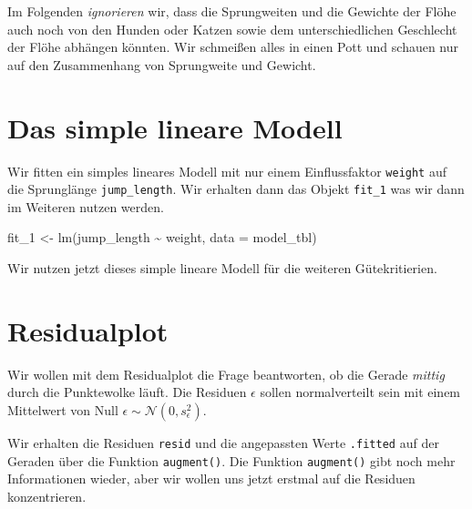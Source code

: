 \documentclass[
  letterpaper,
]{scrbook}
\newenvironment{Shaded}{\begin{snugshade}}{\end{snugshade}}
\newcommand{\AttributeTok}[1]{\textcolor[rgb]{0.40,0.45,0.13}{#1}}
\newcommand{\FunctionTok}[1]{\textcolor[rgb]{0.28,0.35,0.67}{#1}}
\newcommand{\NormalTok}[1]{\textcolor[rgb]{0.00,0.23,0.31}{#1}}
\newcommand{\OtherTok}[1]{\textcolor[rgb]{0.00,0.23,0.31}{#1}}
\newcommand{\SpecialCharTok}[1]{\textcolor[rgb]{0.37,0.37,0.37}{#1}}
\begin{document}
Im Folgenden \emph{ignorieren} wir, dass die Sprungweiten und die
Gewichte der Flöhe auch noch von den Hunden oder Katzen sowie dem
unterschiedlichen Geschlecht der Flöhe abhängen könnten. Wir schmeißen
alles in einen Pott und schauen nur auf den Zusammenhang von Sprungweite
und Gewicht.

\hypertarget{das-simple-lineare-modell}{%
\section{Das simple lineare Modell}\label{das-simple-lineare-modell}}

Wir fitten ein simples lineares Modell mit nur einem Einflussfaktor
\texttt{weight} auf die Sprunglänge \texttt{jump\_length}. Wir erhalten
dann das Objekt \texttt{fit\_1} was wir dann im Weiteren nutzen werden.

\begin{Shaded}
\begin{Highlighting}[]
\NormalTok{fit\_1 }\OtherTok{\textless{}{-}} \FunctionTok{lm}\NormalTok{(jump\_length }\SpecialCharTok{\textasciitilde{}}\NormalTok{ weight, }\AttributeTok{data =}\NormalTok{ model\_tbl)}
\end{Highlighting}
\end{Shaded}

Wir nutzen jetzt dieses simple lineare Modell für die weiteren
Gütekritierien.

\hypertarget{sec-linreg-residual}{%
\section{Residualplot}\label{sec-linreg-residual}}

{}

Wir wollen mit dem Residualplot die Frage beantworten, ob die Gerade
\emph{mittig} durch die Punktewolke läuft. Die Residuen \(\epsilon\)
sollen normalverteilt sein mit einem Mittelwert von Null
\(\epsilon \sim \mathcal{N}(0, s^2_{\epsilon})\).

Wir erhalten die Residuen \texttt{resid} und die angepassten Werte
\texttt{.fitted} auf der Geraden über die Funktion \texttt{augment()}.
Die Funktion \texttt{augment()} gibt noch mehr Informationen wieder,
aber wir wollen uns jetzt erstmal auf die Residuen konzentrieren.
\end{document}
